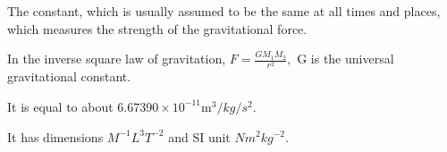 The constant, which is usually assumed to be the same at
all times and places, which measures the strength of the
gravitational force.
\par
In the inverse square law of gravitation, $ F = \frac{GM_1 M_2}{r^2} , $
G is the universal gravitational constant.
\par
It is equal to about $6.67390 \times 10^{-11} \mathrm{m}^{3}/kg/s^{2}.$ 
\par
It has dimensions $M^{-1}L^{3}T^{-2}$  and
SI unit $Nm^{2}kg^{-2}.$